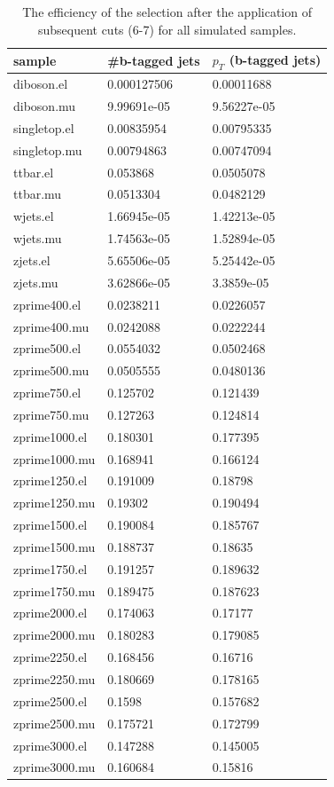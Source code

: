 \begin{table}[H]
  \centering
  \caption{The efficiency of the selection after the application of subsequent cuts (6-7) for all simulated samples.}
  \begin{tabular}{l|ll}
      sample           & \#b-tagged jets  & $p_T$ (b-tagged jets) \\
      \hline
      diboson.el    & 0.000127506 & 0.00011688  \\
      diboson.mu    & 9.99691e-05 & 9.56227e-05 \\
      singletop.el  & 0.00835954  & 0.00795335  \\
      singletop.mu  & 0.00794863  & 0.00747094  \\
      ttbar.el      & 0.053868    & 0.0505078   \\
      ttbar.mu      & 0.0513304   & 0.0482129   \\
      wjets.el      & 1.66945e-05 & 1.42213e-05 \\
      wjets.mu      & 1.74563e-05 & 1.52894e-05 \\
      zjets.el      & 5.65506e-05 & 5.25442e-05 \\
      zjets.mu      & 3.62866e-05 & 3.3859e-05  \\
      zprime400.el  & 0.0238211   & 0.0226057   \\
      zprime400.mu  & 0.0242088   & 0.0222244   \\
      zprime500.el  & 0.0554032   & 0.0502468   \\
      zprime500.mu  & 0.0505555   & 0.0480136   \\
      zprime750.el  & 0.125702    & 0.121439    \\
      zprime750.mu  & 0.127263    & 0.124814    \\
      zprime1000.el & 0.180301    & 0.177395    \\
      zprime1000.mu & 0.168941    & 0.166124    \\
      zprime1250.el & 0.191009    & 0.18798     \\
      zprime1250.mu & 0.19302     & 0.190494    \\
      zprime1500.el & 0.190084    & 0.185767    \\
      zprime1500.mu & 0.188737    & 0.18635     \\
      zprime1750.el & 0.191257    & 0.189632    \\
      zprime1750.mu & 0.189475    & 0.187623    \\
      zprime2000.el & 0.174063    & 0.17177     \\
      zprime2000.mu & 0.180283    & 0.179085    \\
      zprime2250.el & 0.168456    & 0.16716     \\
      zprime2250.mu & 0.180669    & 0.178165    \\
      zprime2500.el & 0.1598      & 0.157682    \\
      zprime2500.mu & 0.175721    & 0.172799    \\
      zprime3000.el & 0.147288    & 0.145005    \\
      zprime3000.mu & 0.160684    & 0.15816
      \end{tabular}
\label{tab:eff_b}


\end{table}
